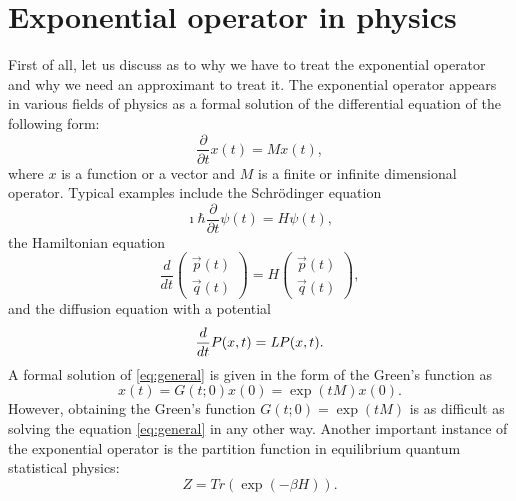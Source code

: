 \section{Exponential operator in physics}
First of all, let us discuss as to why we have to treat the exponential operator and why we need an approximant to treat it. The exponential operator appears in various fields of physics as a formal solution of the differential equation of the following form:
\begin{equation} \label{eq:general}
\dfrac{\partial}{\partial t} x(t) = M x(t),
\end{equation}
where $x$ is a function or a vector and $M$ is a finite or infinite dimensional operator. Typical examples include the Schr\"odinger equation
\begin{equation}
\imath\hbar\dfrac{\partial}{\partial t} \psi(t) = H\psi(t),
\end{equation}
the Hamiltonian equation
\begin{equation}
\dfrac{d}{d t} 
\begin{pmatrix}
\vec{p}(t) \\ \vec{q}(t)
\end{pmatrix}
= H
\begin{pmatrix}
\vec{p}(t) \\ \vec{q}(t)
\end{pmatrix},
\end{equation}
and the diffusion equation with a potential
\begin{equation}
\dfrac{d}{dt}P(x,t) = \emph{L} P(x,t).
\end{equation}
A formal solution of \eqref{eq:general} is given in the form of the Green's function as 
\begin{equation}
x(t) = G(t;0)x(0) = \exp\left({tM}\right)x(0).
\end{equation}
However, obtaining the Green's function $G(t;0) = \exp{(tM)}$ is as difficult as solving the equation \eqref{eq:general} in any other way. Another important instance of the exponential operator is the partition function in equilibrium quantum statistical physics:
\begin{equation}
Z = Tr\left(\exp\left({- \beta H}\right)\right).
\end{equation}

